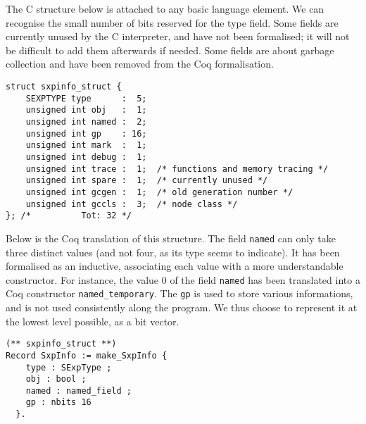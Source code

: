 \documentclass{article}
\newcommand\Coq{Coq}
\newcommand\Cn{C}
\begin{document}
The \Cn{} structure below is attached to any
basic language element.
We can recognise the small number of bits reserved for the type field.
Some fields are currently unused by the \Cn{} interpreter,
and have not been formalised;
it will not be difficult to add them afterwards if needed.
Some fields are about garbage collection
and have been removed from the \Coq{} formalisation.
\begin{verbatim}
struct sxpinfo_struct {
    SEXPTYPE type      :  5;
    unsigned int obj   :  1;
    unsigned int named :  2;
    unsigned int gp    : 16;
    unsigned int mark  :  1;
    unsigned int debug :  1;
    unsigned int trace :  1;  /* functions and memory tracing */
    unsigned int spare :  1;  /* currently unused */
    unsigned int gcgen :  1;  /* old generation number */
    unsigned int gccls :  3;  /* node class */
}; /*          Tot: 32 */
\end{verbatim}
Below is the \Coq{} translation of this structure.
The field \texttt{named} can only take three distinct values
(and not four, as its type seems to indicate).
It has been formalised as an inductive,
associating each value with a more understandable constructor.
For instance, the value \(0\) of the field \texttt{named}
has been translated into a \Coq{} constructor \texttt{named_temporary}.
The \texttt{gp} is used to store various informations,
and is not used consistently along the program.
We thus choose to represent it at the lowest level possible,
as a bit vector.
\begin{verbatim}
(** sxpinfo_struct **)
Record SxpInfo := make_SxpInfo {
    type : SExpType ;
    obj : bool ;
    named : named_field ;
    gp : nbits 16
  }.
\end{verbatim}
\end{document}
